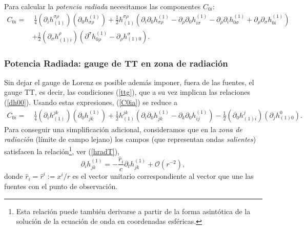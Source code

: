 Para calcular la \textit{potencia radiada} necesitamos las componentes $C_{0i}$:
\begin{align}
C_{0i} = & \  \frac{1}{4}(\partial_i h^{\sigma\rho}_{(1)})(\partial_0 h_{\sigma\rho}^{(1)}) +\frac{1}{2} h^{\sigma\rho}_{(1)}\left(\partial_i\partial_0 h^{(1)}_{\sigma\rho}-\partial_\rho\partial_0
h^{(1)}_{i\sigma}-\partial_\rho\partial_i h^{(1)}_{0\sigma}
+ \partial_\rho\partial_\sigma h^{(1)}_{0i}\right) \nonumber \\
& + \frac{1}{2} (\partial_\sigma h^\rho_{(1)i})\left(\partial^\sigma h^{(1)}_{0\rho}-\partial_\rho h^\sigma_{(1)0}\right). \label{C0ia}
\end{align}

\subsubsection{Potencia Radiada: gauge de TT en zona de radiación}
Sin dejar el gauge de Lorenz es posible además imponer, fuera de las fuentes, el gauge TT, es decir, las condiciones  (\ref{ttg}), que a su vez implican las relaciones (\ref{dh00}). Usando estas expresiones, (\ref{C0ia}) se reduce a
\begin{align}
C_{0i} = & \  \frac{1}{4}(\partial_i h^{jk}_{(1)})(\partial_0 h_{jk}^{(1)})
+\frac{1}{2}h^{jk}_{(1)}\left(\partial_i\partial_0 h^{(1)}_{jk} -\partial_k\partial_0 h^{(1)}_{ij}\right) - \frac{1}{2}(\partial_0 h^j_{(1)i})(\partial_j h^0_{(1)0}).
\end{align}
Para conseguir una simplificación adicional, consideramos que en la \textit{zona de radiación} (límite de campo lejano) los campos (que representan ondas \textit{salientes}) satisfacen la relación\footnote{Esta relación puede también derivarse a partir de la forma asintótica de la solución de la ecuación de onda en coordenadas esféricas.}, ver (\ref{hradT}),
\begin{equation}\label{zrad}
\partial_i h^{(1)}_{jk}=-\frac{\hat{r}_i}{c}\partial_t h^{(1)}_{jk}+\mathcal{O}(r^{-2}),
\end{equation}
donde $\hat{r}_i=\hat{r}^i:=x^i/r$ es el vector unitario correspondiente al vector que une las fuentes con el punto de observación.

